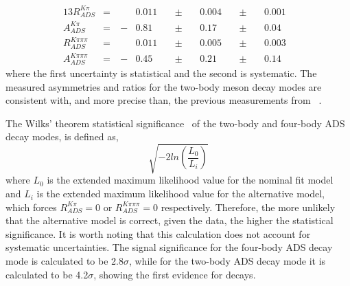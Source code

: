 \begin{alignat*}{13}
R_{ADS}^{K\pi} &= &\ &0.011&\ &\pm&\ &0.004&\ &\pm&\ &0.001& \\
A_{ADS}^{K\pi} &= &\ -&0.81&\ &\pm&\ &0.17&\ &\pm&\ &0.04& \\
R_{ADS}^{K\pi\pi\pi} &= &\ &0.011&\ &\pm&\ &0.005&\ &\pm&\ &0.003& \\
A_{ADS}^{K\pi\pi\pi} &= &\ -&0.45&\ &\pm&\ &0.21&\ &\pm&\ &0.14&
\end{alignat*}
where the first uncertainty is statistical and the second is systematic. The measured asymmetries and ratios for the two-body \Dz meson decay modes are consistent with, and more precise than, the previous measurements from \babar~\cite{BaBarDKstar}. 

The Wilks' theorem statistical significance~\cite{Wilks:1938dza} of the two-body and four-body ADS decay modes, is defined as,
\begin{equation}
\sqrt{-2ln\left(\frac{L_0}{L_i}\right)}
\end{equation}
where $L_0$ is the extended maximum likelihood value for the nominal \CP fit model and $L_i$ is the extended maximum likelihood value for the alternative model, which forces $R_{ADS}^{K\pi} = 0$ or $R_{ADS}^{K\pi\pi\pi} = 0$ respectively. Therefore, the more unlikely that the alternative model is correct, given the data, the higher the statistical significance. It is worth noting that this calculation does not account for systematic uncertainties. The signal significance for the four-body ADS decay mode is calculated to be 2.8$\sigma$, while for the two-body ADS decay mode it is calculated to be 4.2$\sigma$, showing the first evidence for \pik decays.


